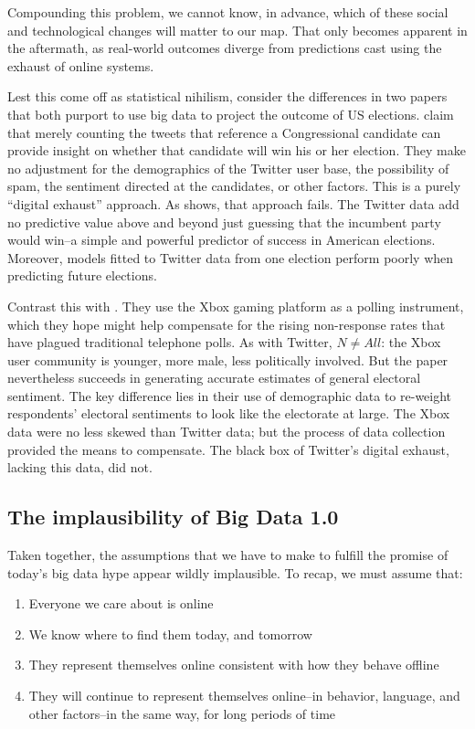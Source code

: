 \documentclass[12pt]{article}
\begin{document}
Compounding this problem, we cannot know, in advance, which of these
social and technological changes will matter to our map. That only
becomes apparent in the aftermath, as real-world outcomes diverge from
predictions cast using the exhaust of online systems.

Lest this come off as statistical nihilism, consider the differences
in two papers that both purport to use big data to project the outcome
of US elections. \cite{digrazia2013} claim that merely counting the
tweets that reference a Congressional candidate can provide insight
on whether that candidate will win his or her election. They make no
adjustment for the demographics of the Twitter user base, the
possibility of spam, the sentiment directed at the candidates, or
other factors. This is a purely ``digital exhaust'' approach. As
\cite{huberty2013twitter} shows, that approach fails. The Twitter data
add no predictive value above and beyond just guessing that the
incumbent party would win--a simple and powerful predictor of success
in American elections. Moreover, models fitted to Twitter data from
one election perform poorly when predicting future elections.

Contrast this with \cite{gelman2013}. They use the Xbox gaming platform as a polling
instrument, which they hope might help compensate for the rising
non-response rates that have plagued traditional telephone polls. As
with Twitter, $N \neq All$: the Xbox user community is younger, more
male, less politically involved. But the paper nevertheless
succeeds in generating accurate estimates of general electoral
sentiment. The key difference lies in their use of demographic data to
re-weight respondents' electoral sentiments to look like the
electorate at large. The Xbox data were no less skewed than Twitter
data; but the process of data collection provided the means to
compensate. The black box of Twitter's digital exhaust, lacking this
data, did not.



\subsection{The implausibility of Big Data 1.0}
\label{sec:impl-big-data}


Taken together, the assumptions that we have to make to fulfill the
promise of today's big data hype appear wildly implausible. To recap,
we must assume that:

\begin{enumerate}
\item Everyone we care about is online
\item We know where to find
  them today, and tomorrow
\item They represent themselves online
  consistent with how they behave offline
\item They will continue
  to represent themselves online--in behavior, language, and other
  factors--in the same way, for long periods of time
\end{enumerate}
\end{document}
